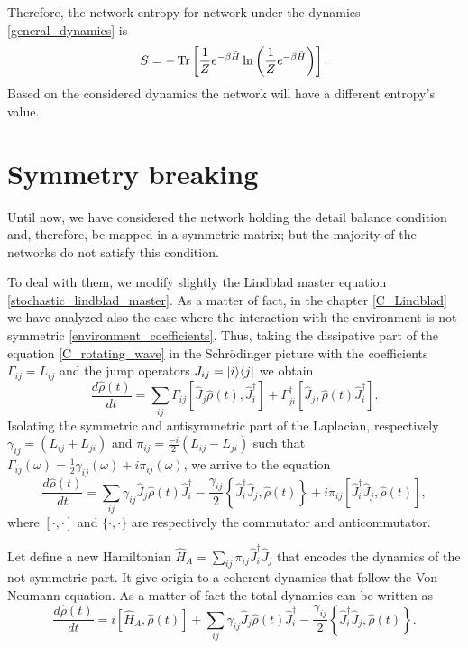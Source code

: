 Therefore, the network entropy for network under the dynamics \eqref{general_dynamics} is 
\begin{equation}
    S = -\operatorname{Tr}\left[\frac{1}{Z}e^{-\beta\hat H}\ln\left(\frac{1}{Z}e^{-\beta\hat H}\right) \right].
\end{equation}
Based on the considered dynamics the network will have a different entropy's value.



\section{Symmetry breaking}

Until now, we have considered the network holding the detail balance condition and, therefore, be mapped in a symmetric matrix; 
but the majority of the networks do not satisfy this condition. 

To deal with them, we modify slightly the Lindblad master equation \eqref{stochastic_lindblad_master}. 
As a matter of fact, in the chapter \ref{C_Lindblad} we have analyzed also the case where the interaction with the environment is not symmetric \eqref{environment_coefficients}. Thus, taking the dissipative part of the equation \eqref{C_rotating_wave} in the Schrödinger picture with the coefficients $\Gamma_{ij} = L_{ij}$ and the jump operators $J_{ij} = \lvert i\rangle\langle j\rvert$ we obtain 
\begin{equation}
    \frac{d\hat\rho(t)}{dt} = \sum_{ij}\Gamma_{ij}\left[\hat J_j\hat\rho(t),\hat J_i^\dagger\right]+\Gamma_{ji}^\dagger\left[\hat J_j,\hat\rho(t)\hat J_i^\dagger\right].
\end{equation}
Isolating the symmetric and antisymmetric part of the Laplacian, respectively $\gamma_{ij} = \left(L_{ij} + L_{ji}\right)$ and $\pi_{ij} =  \frac{-i}{2}\left(L_{ij}-L_{ji}\right)$ such that $\Gamma_{ij}(\omega) =\frac{1}{2}\gamma_{ij}(\omega)+i\pi_{ij}(\omega)$, we arrive to the equation
\begin{equation}
    \frac{d\hat\rho(t)}{dt} = \sum_{ij}\gamma_{ij}\hat J_j\hat\rho(t)\hat J_i^\dagger -\frac{\gamma_{ij}}{2}\left\{\hat J_i^\dagger\hat J_j,\hat\rho(t)\right\} + i\pi_{ij}\left[\hat J_i^\dagger\hat J_j,\hat\rho(t)\right],
\end{equation}
where $[\cdot,\cdot]$ and $\{\cdot,\cdot\}$ are respectively the commutator and anticommutator.

Let define a new Hamiltonian $\hat H_{A} = \sum_{ij}\pi_{ij}\hat J_i^\dagger\hat J_j$ that encodes the dynamics of the not symmetric part. 
It give origin to a coherent dynamics that follow the Von Neumann equation. As a matter of fact the total dynamics can be written as
\begin{equation}\label{antisymmetric_master_equation}
    \frac{d\hat\rho(t)}{dt} = i\left[\hat H_{A},\hat\rho(t)\right] + \sum_{ij}\gamma_{ij}\hat J_j\hat\rho(t)\hat J_i^\dagger -\frac{\gamma_{ij}}{2}\left\{\hat J_i^\dagger\hat J_j,\hat\rho(t)\right\}.
\end{equation}

